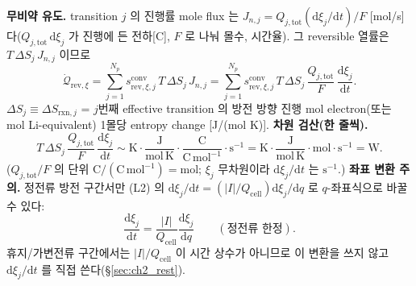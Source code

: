 \documentclass[11pt,a4paper]{article}
\newcommand{\dd}{\mathrm{d}}
\newcommand{\cell}{\mathrm{cell}}
\newcommand{\tot}{\mathrm{tot}}
\newcommand{\rev}{\mathrm{rev}}
\newcommand{\rxn}{\mathrm{rxn}}
\newcommand{\conv}{\mathrm{conv}}
\begin{document}
\textbf{무비약 유도.} transition $j$ 의 진행률 mole flux 는 $J_{n,j}=Q_{j,\tot}(\dd\xi_j/\dd t)/F$ [mol/s]
다($Q_{j,\tot}\,\dd\xi_j$ 가 진행에 든 전하[C], $F$ 로 나눠 몰수, 시간율). 그 reversible 열률은 $T\,\Delta S_j\,J_{n,j}$
이므로
\begin{equation}
\dot{\mathcal Q}_{\rev,\xi}=\sum_{j=1}^{N_p}s_{\rev,\xi,j}^{\conv}\,T\,\Delta S_j\,J_{n,j}
=\sum_{j=1}^{N_p}s_{\rev,\xi,j}^{\conv}\,T\,\Delta S_j\,\frac{Q_{j,\tot}}{F}\,\frac{\dd\xi_j}{\dd t}.
\label{eq:ch2_revxi}
\end{equation}
$\Delta S_j\equiv\Delta S_{\rxn,j}$ = $j$번째 effective transition 의 방전 방향 진행 mol electron(또는 mol
Li-equivalent) 1몰당 entropy change [J/(mol K)]. \textbf{차원 검산(한 줄씩).}
\begin{equation}
T\,\Delta S_j\,\frac{Q_{j,\tot}}{F}\,\frac{\dd\xi_j}{\dd t}\sim
\mathrm K\cdot\frac{\mathrm J}{\mathrm{mol\,K}}\cdot\frac{\mathrm C}{\mathrm{C\,mol^{-1}}}\cdot\mathrm s^{-1}
=\mathrm K\cdot\frac{\mathrm J}{\mathrm{mol\,K}}\cdot\mathrm{mol}\cdot\mathrm s^{-1}=\mathrm W.
\label{eq:ch2_revxi_dim}
\end{equation}
($Q_{j,\tot}/F$ 의 단위 $\mathrm C/(\mathrm{C\,mol^{-1}})=\mathrm{mol}$; $\xi_j$ 무차원이라 $\dd\xi_j/\dd t$ 는
$\mathrm s^{-1}$.) \textbf{좌표 변환 주의.} 정전류 방전 구간서만 (L2) 의 $\dd\xi_j/\dd t=(|I|/Q_\cell)\dd\xi_j/\dd q$
로 $q$-좌표식으로 바꿀 수 있다:
\begin{equation}
\frac{\dd\xi_j}{\dd t}=\frac{|I|}{Q_\cell}\frac{\dd\xi_j}{\dd q}\qquad(\text{정전류 한정}).
\label{eq:ch2_revxi_q}
\end{equation}
휴지/가변전류 구간에서는 $|I|/Q_\cell$ 이 시간 상수가 아니므로 이 변환을 쓰지 않고 $\dd\xi_j/\dd t$ 를 직접
쓴다(\S\ref{sec:ch2_rest}).
\end{document}
